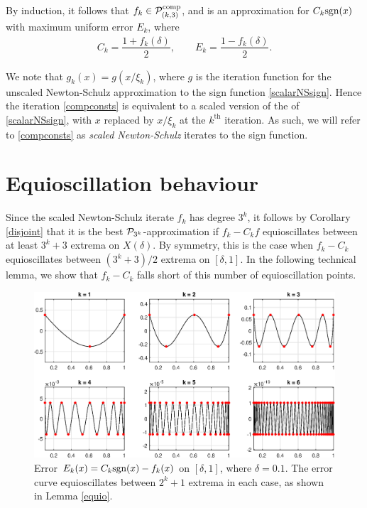 By induction, it follows that $f_k \in \mathcal{P}_{(k,3)}^{\text{comp}}$, and is an approximation for $C_k \text{sgn}(x)$ with maximum uniform error $E_k$, where 
\begin{align}
    C_k = \dfrac{1+f_k(\delta)}{2}, \qquad E_k = \dfrac{1-f_k(\delta)}{2}. \label{Ceekay}
\end{align}

\begin{rmk}
We note that $g_k(x) = g(x/\xi_k)$, where $g$ is the iteration function for the unscaled Newton-Schulz  approximation to the sign function \eqref{scalarNSsign}. Hence the iteration \eqref{compconsts} is equivalent to a scaled version of the of \eqref{scalarNSsign}, with $x$ replaced by $x/\xi_k$ at the $k^{\text{th}}$ iteration. As such, we will refer to \eqref{compconsts} as \textit{scaled Newton-Schulz} iterates to the sign function.
\end{rmk}

\section{Equioscillation behaviour}\label{equiSNS}

Since the scaled Newton-Schulz iterate $f_k$ has degree $3^k$, it follows by Corollary \ref{disjoint} that it is the best $\mathcal{P}_{3^k}$-approximation if $f_k-C_kf$ equioscillates between at least $3^k+3$ extrema on $X(\delta)$. By symmetry, this is the case when $f_k-C_k$ equioscillates between $(3^k+3)/2$ extrema on $[\delta,1]$. In the following technical lemma, we show that $f_k-C_k$ falls short of this number of equioscillation points.

\begin{figure}[t!]
\centering
   \includegraphics[width=\textwidth,height=\textheight,keepaspectratio]{figures/chapter_3/COMPSIGNMANYITERATES2.eps}
   \caption{Error $E_k(x)=C_k\text{sgn}(x)-f_k(x)$ on $[\delta,1]$, where $\delta=0.1$. The error curve equioscillates between $2^{k}+1$ extrema in each case, as shown in Lemma \ref{equio}.}
   \label{fig:compsignmanyiterates}
\end{figure}

